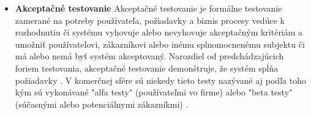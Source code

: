 \documentclass[11pt,twoside,slovak,a4paper]{article}
\begin{document}
\begin{itemize}
		\item \textbf{Akceptačné testovanie} \newline		
			Akceptačné testovanie je formálne testovanie zamerané na potreby používateľa, požiadavky a  biznis procesy vedúce k rozhodnutiu či systému vyhovuje alebo nevyhovuje akceptačným kritériám a umožniť používateľovi, zákazníkovi alebo inému splnomocnenému subjektu či má alebo nemá byť systém akceptovaný\cite{Veenendaal2010}. \newline
			Narozdiel od predchádzajúcich foriem testovania, akceptačné testovanie demonštruje, že systém spĺňa požiadavky \cite{Alba2008}. \newline
			V komerčnej sfére sú niekedy tieto testy nazývané aj podľa toho kým sú vykonávané "alfa testy" (používateľmi vo firme) alebo "beta testy" (súčasnými alebo potenciálnymi zákazníkmi) \cite{Alba2008}.
	\end{itemize}
	
\end{document}
